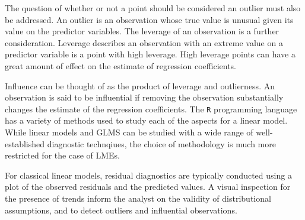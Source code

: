\documentclass[12pt, a4paper]{article}
\begin{document}
			
			
			The question of whether or not a point should be considered an outlier must also be addressed. An outlier is an observation whose true value is unusual given its value on the predictor variables. The leverage of an observation is a further consideration. Leverage describes an observation with an extreme value on a predictor variable is a point with high leverage. High leverage points can have a great amount of effect on the estimate of regression coefficients.
			
			Influence can be thought of as the product of leverage and outlierness. An observation is said to be influential if removing the observation substantially changes the estimate of the regression coefficients. The \texttt{R} programming language has a variety of methods used to study each of the aspects for a linear model. While linear models and GLMS can be studied with a wide range of well-established diagnostic technqiues, the choice of methodology is much more restricted for the case of LMEs.
			
			For classical linear models, residual diagnostics are typically conducted using a plot of the observed residuals and the predicted values. A visual inspection for the presence of trends inform the analyst on the validity of distributional assumptions, and to detect outliers and influential observations.
			
\end{document}
